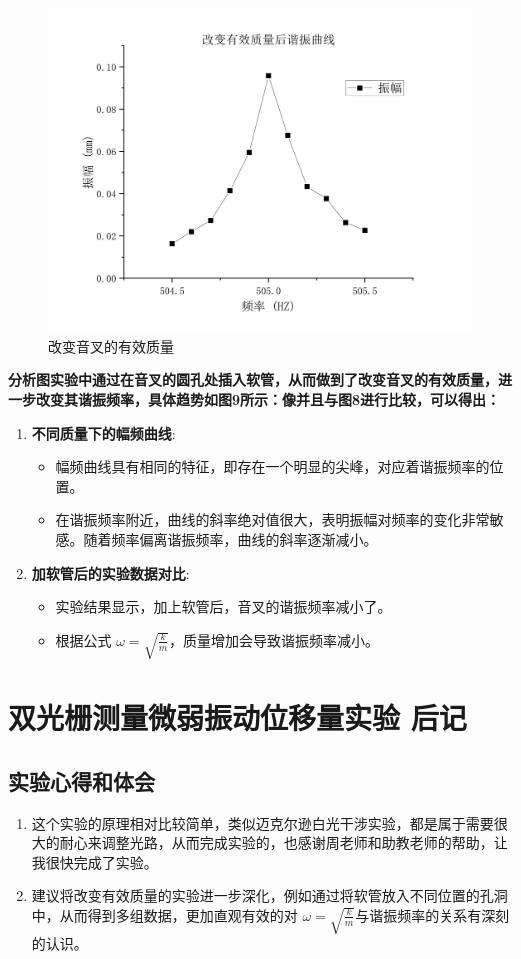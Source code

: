 \documentclass[dvipsnames, svgnames,a4paper,11pt]{article}
\begin{document}
	\begin{figure}[H]
		\centering
		\includegraphics[width=0.3\linewidth]{images/改变有效质量}
		\caption{改变音叉的有效质量}
		\label{}
	\end{figure}
	\textbf{分析图实验中通过在音叉的圆孔处插入软管，从而做到了改变音叉的有效质量，进一步改变其谐振频率，具体趋势如图9所示：像并且与图8进行比较，可以得出：}
	\begin{enumerate}
		\item \textbf{不同质量下的幅频曲线}:
		\begin{itemize}
			\item 幅频曲线具有相同的特征，即存在一个明显的尖峰，对应着谐振频率的位置。
			\item 在谐振频率附近，曲线的斜率绝对值很大，表明振幅对频率的变化非常敏感。随着频率偏离谐振频率，曲线的斜率逐渐减小。
		\end{itemize}
		\item \textbf{加软管后的实验数据对比}:
		\begin{itemize}
			\item 实验结果显示，加上软管后，音叉的谐振频率减小了。
			\item 根据公式 $\omega=\sqrt{\frac{k}{m}}$，质量增加会导致谐振频率减小。
		\end{itemize}
	\end{enumerate}
	\clearpage
	
	\section{双光栅测量微弱振动位移量实验  \quad\heiti  后记}
	
	\subsection{实验心得和体会}
	\begin{enumerate}
		\item 这个实验的原理相对比较简单，类似迈克尔逊白光干涉实验，都是属于需要很大的耐心来调整光路，从而完成实验的，也感谢周老师和助教老师的帮助，让我很快完成了实验。
		\item 建议将改变有效质量的实验进一步深化，例如通过将软管放入不同位置的孔洞中，从而得到多组数据，更加直观有效的对 $\omega=\sqrt{\frac{k}{m}}$与谐振频率的关系有深刻的认识。
	\end{enumerate}
	
\end{document}
